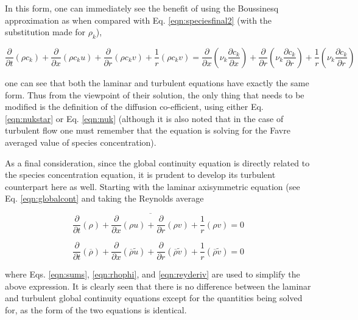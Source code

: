 	In this form, one can immediately see the benefit of using the Boussinesq approximation as 
when compared with Eq. \ref{eqn:speciesfinal2} (with the substitution made for $\rho_k$),

\begin{displaymath}
	\frac{\partial}{\partial t}(\rho c_k) + \frac{\partial}{\partial x}(\rho c_k u) + \frac{\partial}{\partial r}(\rho c_k v)
	+ \frac {1}{r}(\rho c_k v) = \frac{\partial}{\partial x}(\nu_k \frac{\partial c_k}{\partial x}) + \frac{\partial}
	{\partial r}(\nu_k \frac{\partial c_k}{\partial r}) + \frac {1}{r}(\nu_k \frac{\partial c_k}{\partial r})
\end{displaymath}

	one can see that both the laminar and turbulent equations have exactly the same form.  Thus from the viewpoint
of their solution, the only thing that needs to be modified is the definition of the diffusion co-efficient, using either
Eq. \ref{eqn:nukstar} or Eq. \ref{eqn:nuk} (although it is also noted that in the case of turbulent flow one must remember
that the equation is solving for the Favre averaged value of species concentration).  

	As a final consideration, since the global continuity equation is directly related to the species concentration
equation, it is prudent to develop its turbulent counterpart here as well.  Starting with the laminar axisymmetric 
equation (see Eq. \ref{eqn:globalcont} and taking the Reynolds average
	
\begin{displaymath}
	\overline{\frac{\partial}{\partial t}(\rho) + \frac{\partial}{\partial x}(\rho u) + 
	\frac{\partial}{\partial r}(\rho v) + \frac{1}{r}(\rho v)} = 0 
\end{displaymath}

\begin{equation}
	\frac{\partial}{\partial t}(\overline{\rho}) + \frac{\partial}{\partial x}(\overline{\rho}\tilde{u})
	 + \frac{\partial}{\partial r}(\overline{\rho}\tilde{v}) + \frac{1}{r}(\overline{\rho}\tilde{v}) = 0
\label{eqn:turbglobalcont}
\end{equation}

	where Eqs. \ref{eqn:sums}, \ref{eqn:rhophi}, and \ref{eqn:reyderiv} are used to simplify the above expression.  
It is clearly seen that there is no difference between the laminar and turbulent global continuity equations except for 
the quantities being solved for, as the form of the two equations is identical.

